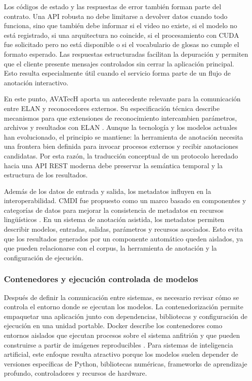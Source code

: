 Los códigos de estado y las respuestas de error también forman parte del contrato. Una API robusta no debe limitarse a devolver datos cuando todo funciona, sino que también debe informar si el video no existe, si el modelo no está registrado, si una arquitectura no coincide, si el procesamiento con CUDA fue solicitado pero no está disponible o si el vocabulario de glosas no cumple el formato esperado. Las respuestas estructuradas facilitan la depuración y permiten que el cliente presente mensajes controlados sin cerrar la aplicación principal. Esto resulta especialmente útil cuando el servicio forma parte de un flujo de anotación interactivo.

En este punto, AVATecH aporta un antecedente relevante para la comunicación entre ELAN y reconocedores externos. Su especificación técnica describe mecanismos para que extensiones de reconocimiento intercambien parámetros, archivos y resultados con ELAN \cite{auer2014avatech}. Aunque la tecnología y los modelos actuales han evolucionado, el principio se mantiene: la herramienta de anotación necesita una frontera bien definida para invocar procesos externos y recibir anotaciones candidatas. Por esta razón, la traducción conceptual de un protocolo heredado hacia una API REST moderna debe preservar la semántica temporal y la estructura de los resultados.

Además de los datos de entrada y salida, los metadatos influyen en la interoperabilidad. CMDI fue propuesto como un marco basado en componentes y categorías de datos para mejorar la consistencia de metadatos en recursos lingüísticos \cite{broeder2010cmdi}. En un sistema de anotación asistida, los metadatos permiten describir modelos, entradas, salidas, parámetros y recursos asociados. Esto evita que los resultados generados por un componente automático queden aislados, ya que pueden relacionarse con el corpus, la herramienta de anotación y la configuración de ejecución.

\subsubsection{Contenedores y ejecución controlada de modelos}

Después de definir la comunicación entre sistemas, es necesario revisar cómo se controla el entorno donde se ejecutan los modelos. La contenedorización permite empaquetar una aplicación junto con dependencias, bibliotecas y configuración de ejecución en una unidad portable. Docker describe los contenedores como entornos aislados que ejecutan procesos sobre el sistema anfitrión y que pueden construirse a partir de imágenes reproducibles \cite{docker2026overview}. Para sistemas de inteligencia artificial, este enfoque resulta atractivo porque los modelos suelen depender de versiones específicas de Python, bibliotecas numéricas, frameworks de aprendizaje profundo, controladores y recursos de hardware.

